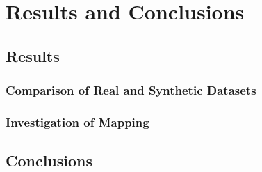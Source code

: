 \chapter{Results and Conclusions}

\section{Results}
\subsection{Comparison of Real and Synthetic Datasets}
\subsection{Investigation of Mapping}
\section{Conclusions}